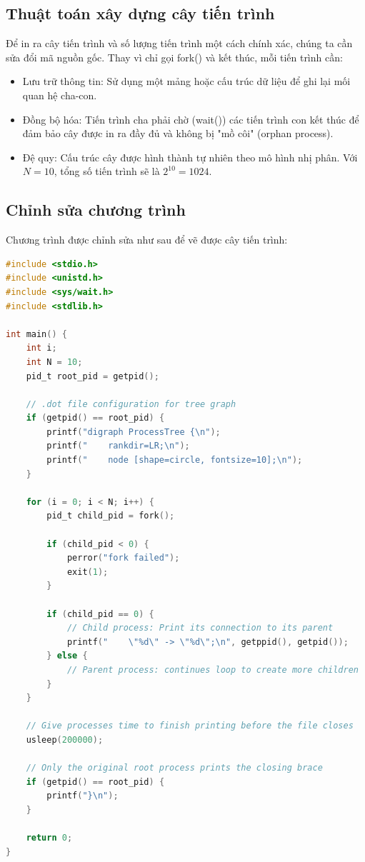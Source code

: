 \documentclass[12pt, letterpaper]{article}
\begin{document}
\subsection{Thuật toán xây dựng cây tiến trình}
Để in ra cây tiến trình và số lượng tiến trình một cách chính xác, chúng ta cần sửa đổi mã nguồn gốc. Thay vì chỉ gọi fork() và kết thúc, mỗi tiến trình cần:
\begin{itemize}
\item Lưu trữ thông tin: Sử dụng một mảng hoặc cấu trúc dữ liệu để ghi lại mối quan hệ cha-con.
\item Đồng bộ hóa: Tiến trình cha phải chờ (wait()) các tiến trình con kết thúc để đảm bảo cây được in ra đầy đủ và không bị "mồ côi" (orphan process).
\item Đệ quy: Cấu trúc cây được hình thành tự nhiên theo mô hình nhị phân. Với $N=10$, tổng số tiến trình sẽ là $2^{10} = 1024$.
\end{itemize}

\subsection{Chỉnh sửa chương trình}
Chương trình được chỉnh sửa như sau để vẽ được cây tiến trình:
\begin{lstlisting}[language=C, caption={Mã nguồn để vẽ được cây tiến trình}]
#include <stdio.h>
#include <unistd.h>
#include <sys/wait.h>
#include <stdlib.h>

int main() {
    int i;
    int N = 10; 
    pid_t root_pid = getpid();

    // .dot file configuration for tree graph
    if (getpid() == root_pid) {
        printf("digraph ProcessTree {\n");
        printf("    rankdir=LR;\n");
        printf("    node [shape=circle, fontsize=10];\n");
    }

    for (i = 0; i < N; i++) {
        pid_t child_pid = fork();

        if (child_pid < 0) {
            perror("fork failed");
            exit(1);
        }

        if (child_pid == 0) {
            // Child process: Print its connection to its parent
            printf("    \"%d\" -> \"%d\";\n", getppid(), getpid());
        } else {
            // Parent process: continues loop to create more children
        }
    }

    // Give processes time to finish printing before the file closes
    usleep(200000); 

    // Only the original root process prints the closing brace
    if (getpid() == root_pid) {
        printf("}\n");
    }

    return 0;
}
\end{lstlisting}
\end{document}
